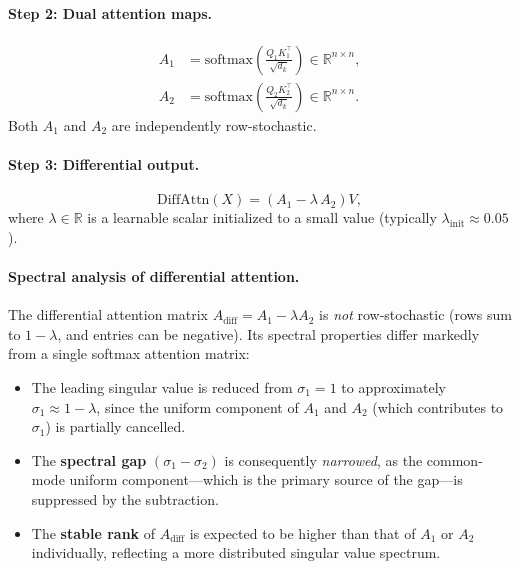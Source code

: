 \documentclass[12pt, a4paper]{article}
\begin{document}
\paragraph{Step 2: Dual attention maps.}
\begin{align}
    A_1 &= \text{softmax}\!\left(\frac{Q_1 K_1^\top}{\sqrt{d_k}}\right)
    \in \mathbb{R}^{n \times n}, \label{eq:A1} \\
    A_2 &= \text{softmax}\!\left(\frac{Q_2 K_2^\top}{\sqrt{d_k}}\right)
    \in \mathbb{R}^{n \times n}. \label{eq:A2}
\end{align}
Both $A_1$ and $A_2$ are independently row-stochastic.

\paragraph{Step 3: Differential output.}
\begin{equation}
    \text{DiffAttn}(X) = \left(A_1 - \lambda\, A_2\right) V,
    \label{eq:diff_output}
\end{equation}
where $\lambda \in \mathbb{R}$ is a learnable scalar initialized to a
small value (typically $\lambda_{\text{init}} \approx 0.05$).

\paragraph{Spectral analysis of differential attention.}
The differential attention matrix $A_{\text{diff}} = A_1 - \lambda A_2$
is \textit{not} row-stochastic (rows sum to $1 - \lambda$, and entries
can be negative). Its spectral properties differ markedly from a single
softmax attention matrix:
\begin{itemize}[leftmargin=1.5em]
    \item The leading singular value is reduced from $\sigma_1 = 1$ to
          approximately $\sigma_1 \approx 1 - \lambda$, since the
          uniform component of $A_1$ and $A_2$ (which contributes to
          $\sigma_1$) is partially cancelled.
    \item The \textbf{spectral gap} $(\sigma_1 - \sigma_2)$ is
          consequently \textit{narrowed}, as the common-mode uniform
          component---which is the primary source of the gap---is
          suppressed by the subtraction.
    \item The \textbf{stable rank} of $A_{\text{diff}}$ is expected to
          be higher than that of $A_1$ or $A_2$ individually, reflecting
          a more distributed singular value spectrum.
\end{itemize}
\end{document}
